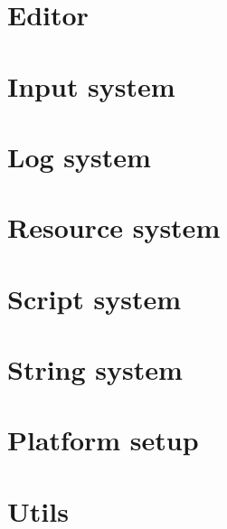 \documentclass[a4paper, 12pt]{report}
\begin{document}


\chapter{Editor}



\chapter{Input system}



\chapter{Log system}



\chapter{Resource system}



\chapter{Script system}



\chapter{String system}
\label{chap:string}



\chapter{Platform setup}



\chapter{Utils}
\label{chap:utils}



\end{document}
